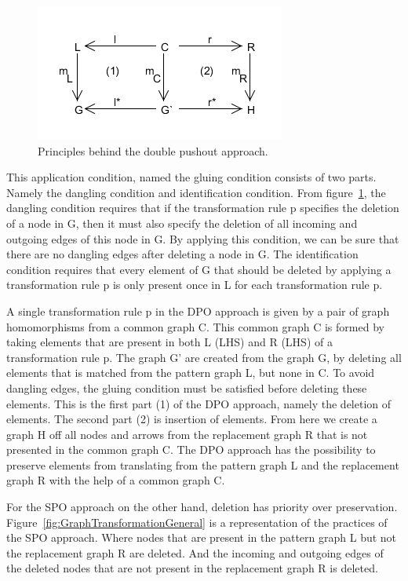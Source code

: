 \documentclass[pdftex,11pt,a4paper]{article}
\begin{document}
\begin{figure}[H]
	\centering
	\includegraphics[scale=0.7]{figures/DPO.png}
	\caption{Principles behind the double pushout approach.}
	\label{fig:DPO}
\end{figure}

\noindent This application condition, named the gluing condition\cite{Loewe1997}
consists of two parts. Namely the dangling condition and identification
condition. From figure~\ref{fig:DPO}, the dangling condition requires that if
the transformation rule p specifies the deletion of a node in G, then it must also
specify the deletion of all incoming and outgoing edges of this node in G. By
applying this condition, we can be sure that there are no dangling edges after
deleting a node in G. The identification condition requires that every element
of G that should be deleted by applying a transformation rule p is only present
once in L for each transformation rule p. 

A single transformation rule p in the DPO approach is given by a pair of graph
homomorphisms from a common graph C. This common graph C is formed by taking
elements that are present in both L (LHS) and R (LHS) of a transformation rule
p. The graph G' are created from the graph G, by deleting all elements that is
matched from the pattern graph L, but none in C. To avoid dangling edges,
the gluing condition must be satisfied before deleting these elements. This is
the first part (1) of the DPO approach, namely the deletion of elements. The
second part (2) is insertion of elements. From here we create a graph H off all
nodes and arrows from the replacement graph R that is not presented in the
common graph C. The DPO approach has the possibility to preserve elements from
translating from the pattern graph L and the replacement graph R with the help
of a common graph C.

For the SPO approach on the other hand, deletion has priority over preservation.
Figure~\ref{fig:GraphTransformationGeneral} is a representation of the practices
of the SPO approach. Where nodes that are present in the pattern graph L but not
the replacement graph R are deleted. And the incoming and outgoing edges of the
deleted nodes that are not present in the replacement graph R is deleted.
\end{document}
